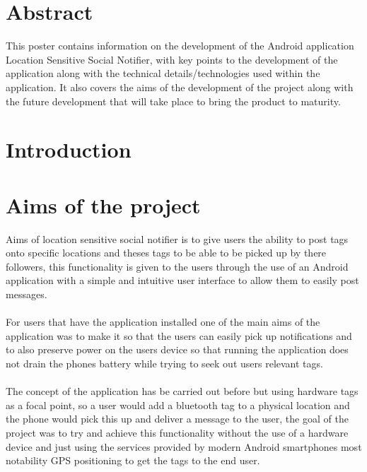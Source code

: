 \documentclass[a0,landscape]{a0poster}
\begin{document}
\begin{multicols}{4} %

\color{Navy}
\section{Abstract}

This poster contains information on the development of the Android application Location Sensitive Social Notifier, with key points to the development of the application along with the technical details/technologies used within the application. It also covers the aims of the development of the project along with the future development that will take place to bring the product to maturity.

\color{Olive}
\section{Introduction}

\color{Black}
\section{Aims of the project}

Aims of location sensitive social notifier is to give users the ability to post tags onto specific locations and theses tags to be able to be picked up by there followers, this functionality is given to the users through the use of an Android application with a simple and intuitive user interface to allow them to easily post messages.\\
\\
For users that have the application installed one of the main aims of the application was to make it so that the users can easily pick up notifications and to also preserve power on the users device so that running the application does not drain the phones battery while trying to seek out users relevant tags.\\
\\
The concept of the application has be carried out before but using hardware tags as a focal point, so a user would add a bluetooth tag to a physical location and the phone would pick this up and deliver a message to the user, the goal of the project was to try and achieve this functionality without the use of a hardware device and just using the services provided by modern Android smartphones most notability GPS positioning to get the tags to the end user.


\end{multicols}
\end{document}
